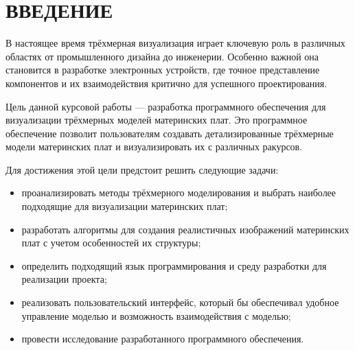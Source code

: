 \chapter*{ВВЕДЕНИЕ}

В настоящее время трёхмерная визуализация играет ключевую роль в различных областях от промышленного дизайна до инженерии. Особенно важной она становится в разработке электронных устройств, где точное представление компонентов и их взаимодействия критично для успешного проектирования.

Цель данной курсовой работы --- разработка программного обеспечения для визуализации трёхмерных моделей материнских плат. Это программное обеспечение позволит пользователям создавать детализированные трёхмерные модели материнских плат и визуализировать их с различных ракурсов.


Для достижения этой цели предстоит решить следующие задачи:
\begin{itemize}[label=---]
	\item проанализировать методы трёхмерного моделирования и выбрать наиболее подходящие для визуализации материнских плат;
	\item разработать алгоритмы для создания реалистичных изображений материнских плат с учетом особенностей их структуры;
	\item определить подходящий язык программирования и среду разработки для реализации проекта;
	\item реализовать пользовательский интерфейс, который бы обеспечивал удобное управление моделью и возможность взаимодействия с моделью;
	\item провести исследование разработанного программного обеспечения.
\end{itemize}
